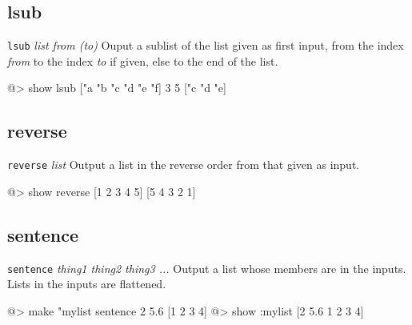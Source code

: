 \subsection*{lsub}  
 
{\tt lsub} {\it list from (to)} 
\newline\newline 
Ouput a sublist of the list given as first input, from the index {\it from} to the index {\it to} if given, else to the end of the list.
\begin{verbatimtab} 
@> show lsub ["a "b "c "d "e "f] 3 5
["c "d "e]
\end{verbatimtab}

\subsection*{reverse}  
 
{\tt reverse} {\it list} 
\newline\newline 
Output a list in the reverse order from that given as input.
\begin{verbatimtab} 
@> show reverse [1 2 3 4 5]
[5 4 3 2 1]
\end{verbatimtab} 

\subsection*{sentence}  
 
{\tt sentence} {\it thing1 thing2 thing3 ...} 
\newline\newline 
Output a list whose members are in the inputs. Lists in the inputs are flattened.
\begin{verbatimtab} 
@> make "mylist sentence 2 5.6 [1 2 3 4]
@> show :mylist
[2 5.6 1 2 3 4]
\end{verbatimtab}
